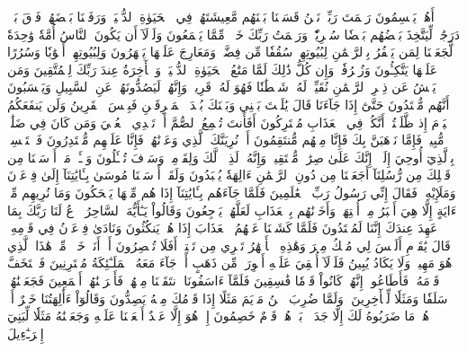 أَهُمۡ يَقۡسِمُونَ رَحۡمَتَ رَبِّكَۚ نَحۡنُ قَسَمۡنَا بَيۡنَهُم مَّعِيشَتَهُمۡ فِي ٱلۡحَيَوٰةِ ٱلدُّنۡيَاۚ وَرَفَعۡنَا بَعۡضَهُمۡ فَوۡقَ بَعۡضٖ دَرَجَٰتٖ لِّيَتَّخِذَ بَعۡضُهُم بَعۡضٗا سُخۡرِيّٗاۗ وَرَحۡمَتُ رَبِّكَ خَيۡرٞ مِّمَّا يَجۡمَعُونَ
وَلَوۡلَآ أَن يَكُونَ ٱلنَّاسُ أُمَّةٗ وَٰحِدَةٗ لَّجَعَلۡنَا لِمَن يَكۡفُرُ بِٱلرَّحۡمَٰنِ لِبُيُوتِهِمۡ سُقُفٗا مِّن فِضَّةٖ وَمَعَارِجَ عَلَيۡهَا يَظۡهَرُونَ
وَلِبُيُوتِهِمۡ أَبۡوَٰبٗا وَسُرُرًا عَلَيۡهَا يَتَّكِـُٔونَ
وَزُخۡرُفٗاۚ وَإِن كُلُّ ذَٰلِكَ لَمَّا مَتَٰعُ ٱلۡحَيَوٰةِ ٱلدُّنۡيَاۚ وَٱلۡأٓخِرَةُ عِندَ رَبِّكَ لِلۡمُتَّقِينَ
وَمَن يَعۡشُ عَن ذِكۡرِ ٱلرَّحۡمَٰنِ نُقَيِّضۡ لَهُۥ شَيۡطَٰنٗا فَهُوَ لَهُۥ قَرِينٞ
وَإِنَّهُمۡ لَيَصُدُّونَهُمۡ عَنِ ٱلسَّبِيلِ وَيَحۡسَبُونَ أَنَّهُم مُّهۡتَدُونَ
حَتَّىٰٓ إِذَا جَآءَنَا قَالَ يَٰلَيۡتَ بَيۡنِي وَبَيۡنَكَ بُعۡدَ ٱلۡمَشۡرِقَيۡنِ فَبِئۡسَ ٱلۡقَرِينُ
وَلَن يَنفَعَكُمُ ٱلۡيَوۡمَ إِذ ظَّلَمۡتُمۡ أَنَّكُمۡ فِي ٱلۡعَذَابِ مُشۡتَرِكُونَ
أَفَأَنتَ تُسۡمِعُ ٱلصُّمَّ أَوۡ تَهۡدِي ٱلۡعُمۡيَ وَمَن كَانَ فِي ضَلَٰلٖ مُّبِينٖ
فَإِمَّا نَذۡهَبَنَّ بِكَ فَإِنَّا مِنۡهُم مُّنتَقِمُونَ
أَوۡ نُرِيَنَّكَ ٱلَّذِي وَعَدۡنَٰهُمۡ فَإِنَّا عَلَيۡهِم مُّقۡتَدِرُونَ
فَٱسۡتَمۡسِكۡ بِٱلَّذِيٓ أُوحِيَ إِلَيۡكَۖ إِنَّكَ عَلَىٰ صِرَٰطٖ مُّسۡتَقِيمٖ
وَإِنَّهُۥ لَذِكۡرٞ لَّكَ وَلِقَوۡمِكَۖ وَسَوۡفَ تُسۡـَٔلُونَ
وَسۡـَٔلۡ مَنۡ أَرۡسَلۡنَا مِن قَبۡلِكَ مِن رُّسُلِنَآ أَجَعَلۡنَا مِن دُونِ ٱلرَّحۡمَٰنِ ءَالِهَةٗ يُعۡبَدُونَ
وَلَقَدۡ أَرۡسَلۡنَا مُوسَىٰ بِـَٔايَٰتِنَآ إِلَىٰ فِرۡعَوۡنَ وَمَلَإِيْهِۦ فَقَالَ إِنِّي رَسُولُ رَبِّ ٱلۡعَٰلَمِينَ
فَلَمَّا جَآءَهُم بِـَٔايَٰتِنَآ إِذَا هُم مِّنۡهَا يَضۡحَكُونَ
وَمَا نُرِيهِم مِّنۡ ءَايَةٍ إِلَّا هِيَ أَكۡبَرُ مِنۡ أُخۡتِهَاۖ وَأَخَذۡنَٰهُم بِٱلۡعَذَابِ لَعَلَّهُمۡ يَرۡجِعُونَ
وَقَالُواْ يَـٰٓأَيُّهَ ٱلسَّاحِرُ ٱدۡعُ لَنَا رَبَّكَ بِمَا عَهِدَ عِندَكَ إِنَّنَا لَمُهۡتَدُونَ
فَلَمَّا كَشَفۡنَا عَنۡهُمُ ٱلۡعَذَابَ إِذَا هُمۡ يَنكُثُونَ
وَنَادَىٰ فِرۡعَوۡنُ فِي قَوۡمِهِۦ قَالَ يَٰقَوۡمِ أَلَيۡسَ لِي مُلۡكُ مِصۡرَ وَهَٰذِهِ ٱلۡأَنۡهَٰرُ تَجۡرِي مِن تَحۡتِيٓۚ أَفَلَا تُبۡصِرُونَ
أَمۡ أَنَا۠ خَيۡرٞ مِّنۡ هَٰذَا ٱلَّذِي هُوَ مَهِينٞ وَلَا يَكَادُ يُبِينُ
فَلَوۡلَآ أُلۡقِيَ عَلَيۡهِ أَسۡوِرَةٞ مِّن ذَهَبٍ أَوۡ جَآءَ مَعَهُ ٱلۡمَلَـٰٓئِكَةُ مُقۡتَرِنِينَ
فَٱسۡتَخَفَّ قَوۡمَهُۥ فَأَطَاعُوهُۚ إِنَّهُمۡ كَانُواْ قَوۡمٗا فَٰسِقِينَ
فَلَمَّآ ءَاسَفُونَا ٱنتَقَمۡنَا مِنۡهُمۡ فَأَغۡرَقۡنَٰهُمۡ أَجۡمَعِينَ
فَجَعَلۡنَٰهُمۡ سَلَفٗا وَمَثَلٗا لِّلۡأٓخِرِينَ
۞وَلَمَّا ضُرِبَ ٱبۡنُ مَرۡيَمَ مَثَلًا إِذَا قَوۡمُكَ مِنۡهُ يَصِدُّونَ
وَقَالُوٓاْ ءَأَٰلِهَتُنَا خَيۡرٌ أَمۡ هُوَۚ مَا ضَرَبُوهُ لَكَ إِلَّا جَدَلَۢاۚ بَلۡ هُمۡ قَوۡمٌ خَصِمُونَ
إِنۡ هُوَ إِلَّا عَبۡدٌ أَنۡعَمۡنَا عَلَيۡهِ وَجَعَلۡنَٰهُ مَثَلٗا لِّبَنِيٓ إِسۡرَـٰٓءِيلَ
